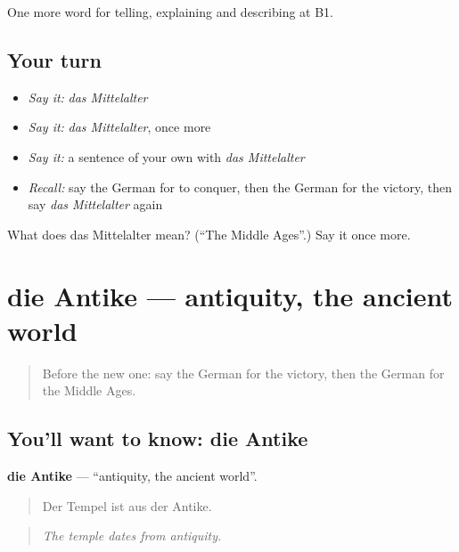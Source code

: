 \begin{grammarlens}[title={What you've built}]
One more word for telling, explaining and describing at B1.
\end{grammarlens}

\subsection*{Your turn}
\begin{itemize}
\raggedright
  \item \emph{Say it:} \emph{das Mittelalter}
  \item \emph{Say it:} \emph{das Mittelalter}, once more
  \item \emph{Say it:} a sentence of your own with \emph{das Mittelalter}
  \item \emph{Recall:} say the German for to conquer, then the German for the victory, then say \emph{das Mittelalter} again
\end{itemize}

\begin{tcolorbox}[breakable,colback=teal!4,colframe=teal!35!black,title={Before you move on}]
What does das Mittelalter mean? (\textquotedblleft{}The Middle Ages\textquotedblright{}.) Say it once more.
\end{tcolorbox}
\section[die Antike]{die Antike — antiquity, the ancient world}

\label{lesson:GE-C320-antike}



\begin{quote}
Before the new one: say the German for the victory, then the German for the Middle Ages.
\end{quote}

\subsection*{You'll want to know: die Antike}
\textbf{die Antike} — \textquotedblleft{}antiquity, the ancient world\textquotedblright{}.

\begin{quote}
Der Tempel ist aus der Antike.
\end{quote}

\begin{quote}
\emph{The temple dates from antiquity.}
\end{quote}

